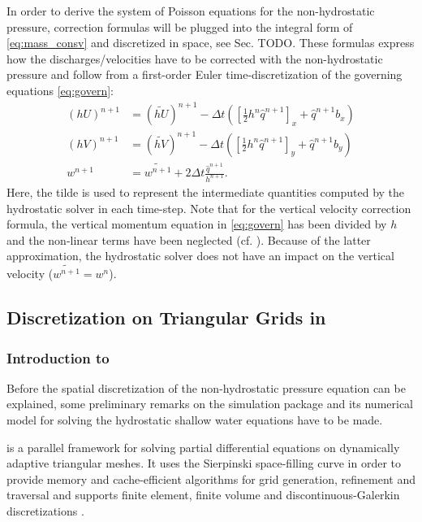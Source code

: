 In order to derive the system of Poisson equations for the non-hydrostatic pressure, correction formulas will be plugged into the integral form of \eqref{eq:mass_consv} and discretized in space, see Sec. TODO. These formulas express how the discharges/velocities have to be corrected with the non-hydrostatic pressure and follow from a first-order Euler time-discretization of the governing equations \eqref{eq:govern}:
\begin{align}
(hU)^{n+1}&= (\widetilde{hU})^{n+1} -\Delta t \left(\left[\frac{1}{2}h^{n}\hat{q}^{n+1}\right]_x+\hat q^{n+1}b_x\right)
\\
(hV)^{n+1}&= (\widetilde{hV})^{n+1} -\Delta t \left(\left[\frac{1}{2}h^{n}\hat{q}^{n+1}\right]_y+\hat q^{n+1}b_y\right)
\\
w^{n+1}&= \widetilde{w^{n+1}}+ 2\Delta t \frac{\hat q^{n+1}}{h^{n+1}}.
\end{align}
Here, the tilde is used to represent the intermediate quantities computed by the hydrostatic solver in each time-step. Note that for the vertical velocity correction formula, the vertical momentum equation in  \eqref{eq:govern} has been divided by $h$ and the non-linear terms have been neglected (cf. \cite{cui}). Because of the latter approximation, the hydrostatic solver does not have an impact on the vertical velocity ($\widetilde{w^{n+1}}=w^{n}$). 





\subsection{Discretization on Triangular Grids in \samoa}

\subsubsection*{Introduction to \samoa}
Before the spatial discretization of the non-hydrostatic pressure equation can be explained, some preliminary remarks on the simulation package \samoa and its numerical model for solving the hydrostatic shallow water equations have to be made.

\samoa is a parallel framework for solving partial differential equations on dynamically adaptive triangular meshes. It uses the Sierpinski space-filling curve in order to provide memory and cache-efficient algorithms for grid generation, refinement and traversal and supports finite element, finite volume and discontinuous-Galerkin discretizations \cite{meister11software}.  

